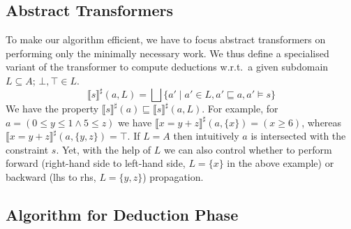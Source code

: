 \subsection{Abstract Transformers} \label{sec:abst}

To make our algorithm efficient, we have to focus abstract
transformers on performing only the minimally necessary
work. 
%
We thus define a specialised variant of the transformer to compute
deductions w.r.t.\ a given subdomain $L\subseteq A$; $\bot,\top \in L$.
\[\llbracket s \rrbracket^\sharp(a,L)=\bigsqcup \{a'\mid a'\in L, a' \sqsubseteq a, a'\models s\}\]
We have the property $\llbracket s \rrbracket^\sharp(a)\sqsubseteq \llbracket s \rrbracket^\sharp(a,L)$.
%
For example, for
$a=(0\leq y \leq 1 \wedge 5\leq z)$ we have
$\llbracket x=y+z\rrbracket^\sharp(a,\{x\})=(x\geq 6)$, whereas
$\llbracket x=y+z\rrbracket^\sharp(a,\{y,z\})=\top$.
%
If $L=A$ then intuitively $a$ is intersected with the constraint $s$.
Yet, with the help of $L$ we can also control whether to perform
forward (right-hand side to left-hand side, $L=\{x\}$ in the above
example) or backward (lhs to rhs, $L=\{y,z\}$) propagation.





\subsection{Algorithm for Deduction Phase}
%



